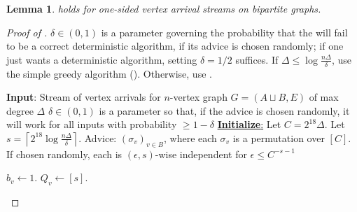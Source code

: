 \documentclass[10pt]{article}
\newtheorem{lemma}[theorem]{Lemma}
\theoremstyle{definition}\newtheorem{definition}[lemma]{Definition}
\theoremstyle{remark}  \newtheorem*{remark}{Remark}
\newcommand{\tO}{\widetilde{O}}
\newcommand{\ceil}[1]{{\left\lceil{#1}\right\rceil}}
\begin{document}
\begin{lemma}\label{lem:online-bpt-det-va-edgecol}
   holds for one-sided vertex arrival streams on bipartite graphs.
\end{lemma}

\begin{proof}[Proof of ]
  $\delta \in (0,1)$ is a parameter governing the probability that the   will fail to be a correct deterministic algorithm, if its advice is chosen randomly; if one just wants a deterministic algorithm, setting $\delta = 1/2$ suffices. If $\Delta \le \log\frac{n \Delta}{\delta}$, use the simple greedy algorithm (). Otherwise, use .
  
  \begin{algorithm}[htb!]
    \caption{Deterministic algorithm for $O(\Delta)$ edge coloring for (adversarial) one sided vertex arrival bipartite streams, using $\tO(n)$ bits of advice\label{alg:bpt-det-va-edgecol}}
    \begin{algorithmic}[1]
    \Statex \textbf{Input}: Stream of vertex arrivals for $n$-vertex graph $G=(A \sqcup B,E)$ of max degree $\Delta$
      \Statex
      \Statex $\delta \in (0,1)$ is a parameter so that, if the advice is chosen randomly, it will work for all inputs with probability $\ge 1 - \delta$
      \Statex
      \Statex \underline{\textbf{Initialize}:}
      \Statex Let $C = 2^{18} \Delta$. %
      \Statex Let $s = \ceil{2^{18} \log\frac{n \Delta}{\delta}} $.
      \Statex Advice: $(\sigma_v)_{v \in B}$, where each $\sigma_v$ is a permutation over $[C]$. If chosen randomly, each is $(\epsilon,s)$-wise independent for $\epsilon \le C^{-s - 1}$
      
        \State $b_v \gets 1$.
        \State $Q_v \gets [s]$.
      \EndFor
      

\end{algorithmic}
\end{algorithm}
\end{proof}
\end{document}
